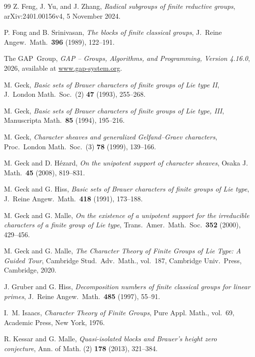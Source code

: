 \documentclass[10pt]{amsart}
\theoremstyle{definition}
\newcommand{\GAP}{\textsf{GAP}}
\numberwithin{equation}{section}
\numberwithin{table}{section}
\begin{document}
\begin{thebibliography}{99}
Z. Feng, J. Yu, and J. Zhang,
{\it Radical subgroups of finite reductive groups},
arXiv:2401.00156v4, 5 November 2024.

P. Fong and B. Srinivasan,
{\it The blocks of finite classical groups},
J.\ Reine Angew.\ Math.\ \textbf{396} (1989), 122--191.

The \GAP~Group,
{\it \textup{\GAP} -- Groups, Algorithms, and Programming, Version 4.16.0},
2026, available at
\href{https://www.gap-system.org}{www.gap-system.org}.

M. Geck,
{\it Basic sets of Brauer characters of finite groups of Lie type II},
J.\ London Math.\ Soc.\ (2) \textbf{47} (1993), 255--268.

M. Geck,
{\it Basic sets of Brauer characters of finite groups of Lie type, III},
Manuscripta Math.\ \textbf{85} (1994), 195--216.

M. Geck,
{\it Character sheaves and generalized Gelfand--Graev characters},
Proc.\ London Math.\ Soc.\ (3) \textbf{78} (1999), 139--166.

M. Geck and D. H\'ezard,
{\it On the unipotent support of character sheaves},
Osaka J. Math.\ \textbf{45} (2008), 819--831.

M. Geck and G. Hiss,
{\it Basic sets of Brauer characters of finite groups of Lie type},
J.\ Reine Angew.\ Math.\ \textbf{418} (1991), 173--188.

M. Geck and G. Malle,
{\it On the existence of a unipotent support for the irreducible characters
of a finite group of Lie type},
Trans.\ Amer.\ Math.\ Soc.\ \textbf{352} (2000), 429--456.

M. Geck and G. Malle,
{\it The Character Theory of Finite Groups of Lie Type: A Guided Tour},
Cambridge Stud.\ Adv.\ Math., vol.~187,
Cambridge Univ.\ Press, Cambridge, 2020.

J. Gruber and G. Hiss,
{\it Decomposition numbers of finite classical groups for linear primes},
J.\ Reine Angew.\ Math.\ \textbf{485} (1997), 55--91.

I.~M. Isaacs,
{\it Character Theory of Finite Groups},
Pure Appl. Math., vol.~69,
Academic Press, New York, 1976.

R. Kessar and G. Malle,
{\it Quasi-isolated blocks and Brauer's height zero conjecture},
Ann. of Math. (2) \textbf{178} (2013), 321--384.


\end{thebibliography}
\end{document}
